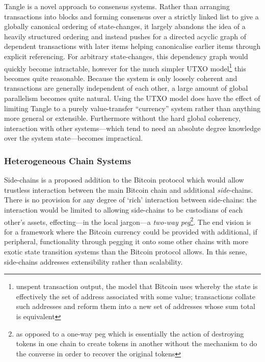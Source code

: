 \documentclass[usepdftitle=false]{beamer}
\begin{document}
\begin{frame}
Tangle \cite{iota2016tangle} is a novel approach to consensus systems. Rather than arranging transactions into blocks and forming consensus over a strictly linked list to give a globally canonical ordering of state-changes, it largely abandons the idea of a heavily structured ordering and instead pushes for a directed acyclic graph of dependent transactions with later items helping canonicalise earlier items through explicit referencing. For arbitrary state-changes, this dependency graph would quickly become intractable, however for the much simpler UTXO model\footnote{unspent transaction output, the model that Bitcoin uses whereby the state is effectively the set of address associated with some value; transactions collate such addresses and reform them into a new set of addresses whose sum total is equivalent} this becomes quite reasonable. Because the system is only loosely coherent and transactions are generally independent of each other, a large amount of global parallelism becomes quite natural. Using the UTXO model does have the effect of limiting Tangle to a purely value-transfer ``currency'' system rather than anything more general or extensible. Furthermore without the hard global coherency, interaction with other systems---which tend to need an absolute degree knowledge over the system state---becomes impractical.

\subsubsection{Heterogeneous Chain Systems}\label{heterogenous}

Side-chains \cite{blockstream2014sidechains} is a proposed addition to the Bitcoin protocol which would allow trustless interaction between the main Bitcoin chain and additional \textit{side}-chains. There is no provision for any degree of `rich' interaction between side-chains: the interaction would be limited to allowing side-chains to be custodians of each other's assets, effecting---in the local jargon---a \textit{two-way peg}\footnote{as opposed to a one-way peg which is essentially the action of destroying tokens in one chain to create tokens in another without the mechanism to do the converse in order to recover the original tokens}. The end vision is for a framework where the Bitcoin currency could be provided with additional, if peripheral, functionality through pegging it onto some other chains with more exotic state transition systems than the Bitcoin protocol allows. In this sense, side-chains addresses extensibility rather than scalability.


\end{frame}
\end{document}
